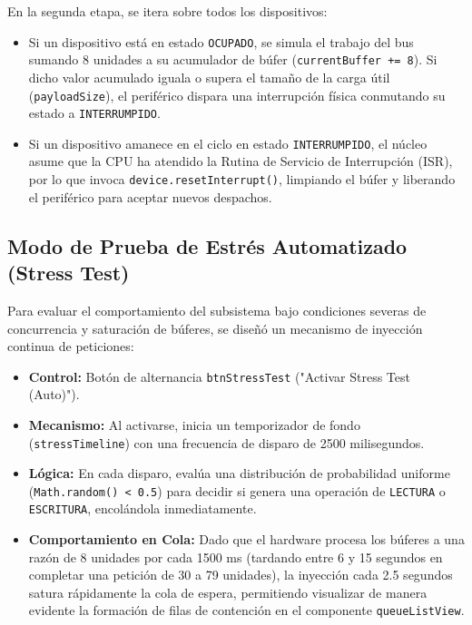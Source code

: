 \documentclass[11pt,letterpaper]{article}
\begin{document}
En la segunda etapa, se itera sobre todos los dispositivos:
\begin{itemize}
    \item Si un dispositivo está en estado \texttt{OCUPADO}, se simula el trabajo del bus sumando 8 unidades a su acumulador de búfer (\texttt{currentBuffer += 8}). Si dicho valor acumulado iguala o supera el tamaño de la carga útil (\texttt{payloadSize}), el periférico dispara una interrupción física conmutando su estado a \texttt{INTERRUMPIDO}.
    \item Si un dispositivo amanece en el ciclo en estado \texttt{INTERRUMPIDO}, el núcleo asume que la CPU ha atendido la Rutina de Servicio de Interrupción (ISR), por lo que invoca \texttt{device.resetInterrupt()}, limpiando el búfer y liberando el periférico para aceptar nuevos despachos.
\end{itemize}

\subsection{Modo de Prueba de Estrés Automatizado (Stress Test)}
Para evaluar el comportamiento del subsistema bajo condiciones severas de concurrencia y saturación de búferes, se diseñó un mecanismo de inyección continua de peticiones:
\begin{itemize}
    \item \textbf{Control:} Botón de alternancia \texttt{btnStressTest} ("Activar Stress Test (Auto)").
    \item \textbf{Mecanismo:} Al activarse, inicia un temporizador de fondo (\texttt{stressTimeline}) con una frecuencia de disparo de 2500 milisegundos.
    \item \textbf{Lógica:} En cada disparo, evalúa una distribución de probabilidad uniforme (\texttt{Math.random() < 0.5}) para decidir si genera una operación de \texttt{LECTURA} o \texttt{ESCRITURA}, encolándola inmediatamente.
    \item \textbf{Comportamiento en Cola:} Dado que el hardware procesa los búferes a una razón de 8 unidades por cada 1500 ms (tardando entre 6 y 15 segundos en completar una petición de 30 a 79 unidades), la inyección cada 2.5 segundos satura rápidamente la cola de espera, permitiendo visualizar de manera evidente la formación de filas de contención en el componente \texttt{queueListView}.
\end{itemize}

\end{document}
